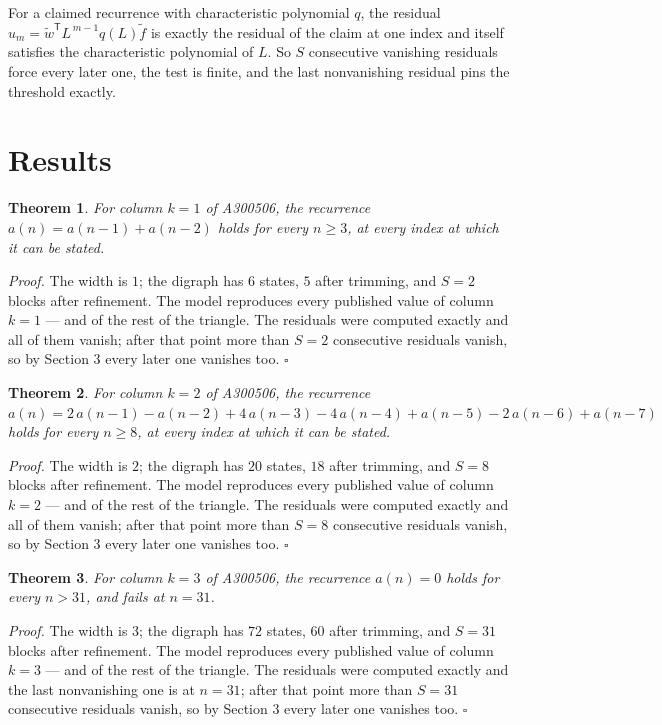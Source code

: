 \documentclass[11pt]{article}
\newtheorem{theorem}{Theorem}
\theoremstyle{definition}
\begin{document}
For a claimed recurrence with characteristic polynomial $q$, the residual $u_m = \tilde w^{\mathsf T}L^{\,m-1}q(L)\tilde f$ is exactly the residual of the claim at one index and itself satisfies the characteristic polynomial of $L$. So $S$ consecutive vanishing residuals force every later one, the test is finite, and the last nonvanishing residual pins the threshold exactly.

\section{Results}

\begin{theorem} For column $k = 1$ of A300506, the recurrence $a(n) = a(n-1) + a(n-2)$ holds for every $n \ge 3$, at every index at which it can be stated.\end{theorem}

{\itshape Proof.} The width is $1$; the digraph has $6$ states, $5$ after trimming, and $S = 2$ blocks after refinement. The model reproduces every published value of column $k = 1$ --- and of the rest of the triangle. The residuals were computed exactly and all of them vanish; after that point more than $S = 2$ consecutive residuals vanish, so by Section 3 every later one vanishes too. $\square$

\begin{theorem} For column $k = 2$ of A300506, the recurrence $a(n) = 2\,a(n-1) - a(n-2) + 4\,a(n-3) - 4\,a(n-4) + a(n-5) - 2\,a(n-6) + a(n-7)$ holds for every $n \ge 8$, at every index at which it can be stated.\end{theorem}

{\itshape Proof.} The width is $2$; the digraph has $20$ states, $18$ after trimming, and $S = 8$ blocks after refinement. The model reproduces every published value of column $k = 2$ --- and of the rest of the triangle. The residuals were computed exactly and all of them vanish; after that point more than $S = 8$ consecutive residuals vanish, so by Section 3 every later one vanishes too. $\square$

\begin{theorem} For column $k = 3$ of A300506, the recurrence $a(n) = 0$ holds for every $n > 31$, and fails at $n = 31$.\end{theorem}

{\itshape Proof.} The width is $3$; the digraph has $72$ states, $60$ after trimming, and $S = 31$ blocks after refinement. The model reproduces every published value of column $k = 3$ --- and of the rest of the triangle. The residuals were computed exactly and the last nonvanishing one is at $n = 31$; after that point more than $S = 31$ consecutive residuals vanish, so by Section 3 every later one vanishes too. $\square$
\end{document}

